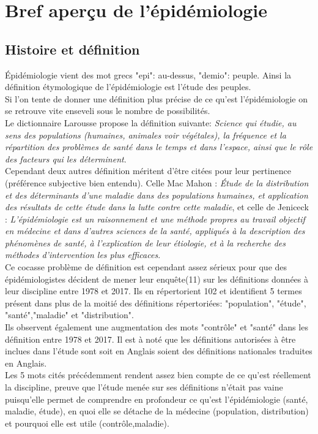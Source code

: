 \documentclass{book}
\begin{document}
\newpage
\section{Bref aperçu de l'épidémiologie}

\subsection{Histoire et définition}
\noindent
Épidémiologie vient des mot grecs "epi": au-dessus, "demio": peuple. Ainsi la définition étymologique de l'épidémiologie est l'étude des peuples.\\
Si l'on tente de donner une définition plus précise de ce qu'est l'épidémiologie on se retrouve vite enseveli sous le nombre de possibilités.\\
Le dictionnaire Larousse propose la définition suivante: \textit{Science qui étudie, au sens des populations (humaines, animales voir végétales), la fréquence et la répartition des problèmes de santé dans le temps et dans l'espace, ainsi que le rôle des facteurs qui les déterminent}.\\
Cependant deux autres définition méritent d'être citées pour leur pertinence (préférence subjective bien entendu). Celle Mac Mahon : \textit{Étude de la distribution et des déterminants d'une maladie dans des populations humaines, et application des résultats de cette étude dans la lutte contre cette maladie}, et celle de Jeniceck : \textit{L'épidémiologie est un raisonnement et une méthode propres au travail objectif en médecine et dans d'autres sciences de la santé, appliqués à la description des phénomènes de santé, à l'explication de leur étiologie, et à la recherche des méthodes d'intervention les plus efficaces}.\\

Ce cocasse problème de définition est cependant assez sérieux pour que des épidémiologistes décident de mener leur enquête(11) sur les définitions données à leur discipline entre 1978 et 2017. Ils en répertorient 102 et identifient 5 termes présent dans plus de la moitié des définitions répertoriées: "population", "étude", "santé","maladie" et "distribution".\\
Ils observent également une augmentation des mots "contrôle" et "santé" dans les définition entre 1978 et 2017. Il est à noté que les définitions autorisées à être inclues dans l'étude sont soit en Anglais soient des définitions nationales traduites en Anglais.\\
Les 5 mots cités précédemment rendent assez bien compte de ce qu'est réellement la discipline, preuve que l'étude menée sur ses définitions n'était pas vaine puisqu'elle permet de comprendre en profondeur ce qu'est l'épidémiologie (santé, maladie, étude), en quoi elle se détache de la médecine (population, distribution) et pourquoi elle est utile (contrôle,maladie).\\
\end{document}
